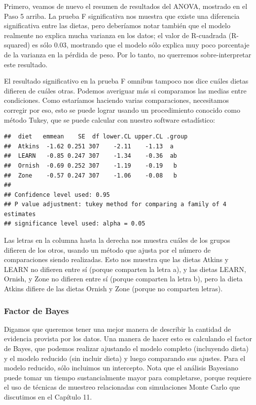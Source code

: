 \documentclass[
  12pt,
]{book}
\theoremstyle{definition}
\theoremstyle{definition}
\theoremstyle{definition}
\theoremstyle{remark}
\begin{document}
Primero, veamos de nuevo el resumen de resultados del ANOVA, mostrado en el Paso 5 arriba. La prueba F significativa nos muestra que existe una diferencia significativa entre las dietas, pero deberíamos notar también que el modelo realmente no explica mucha varianza en los datos; el valor de R-cuadrada (R-squared) es sólo 0.03, mostrando que el modelo sólo explica muy poco porcentaje de la varianza en la pérdida de peso. Por lo tanto, no querremos sobre-interpretar este resultado.

El resultado significativo en la prueba F omnibus tampoco nos dice cuáles dietas difieren de cuáles otras. Podemos averiguar más si comparamos las medias entre condiciones. Como estaríamos haciendo varias comparaciones, necesitamos corregir por eso, esto se puede lograr usando un procedimiento conocido como método Tukey, que se puede calcular con nuestro software estadístico:

\begin{verbatim}
##  diet   emmean    SE  df lower.CL upper.CL .group
##  Atkins  -1.62 0.251 307    -2.11    -1.13  a    
##  LEARN   -0.85 0.247 307    -1.34    -0.36  ab   
##  Ornish  -0.69 0.252 307    -1.19    -0.19   b   
##  Zone    -0.57 0.247 307    -1.06    -0.08   b   
## 
## Confidence level used: 0.95 
## P value adjustment: tukey method for comparing a family of 4 estimates 
## significance level used: alpha = 0.05
\end{verbatim}

Las letras en la columna hasta la derecha nos muestra cuáles de los grupos difieren de los otros, usando un método que ajusta por el número de comparaciones siendo realizadas. Esto nos muestra que las dietas Atkins y LEARN no difieren entre sí (porque comparten la letra a), y las dietas LEARN, Ornish, y Zone no difieren entre sí (porque comparten la letra b), pero la dieta Atkins difiere de las dietas Ornish y Zone (porque no comparten letras).

\hypertarget{factor-de-bayes}{%
\subsubsection{Factor de Bayes}\label{factor-de-bayes}}

Digamos que queremos tener una mejor manera de describir la cantidad de evidencia provista por los datos. Una manera de hacer esto es calculando el factor de Bayes, que podemos realizar ajustando el modelo completo (incluyendo dieta) y el modelo reducido (sin incluir dieta) y luego comparando sus ajustes. Para el modelo reducido, sólo incluimos un intercepto. Nota que el análisis Bayesiano puede tomar un tiempo sustancialmente mayor para completarse, porque requiere el uso de técnicas de muestreo relacionadas con simulaciones Monte Carlo que discutimos en el Capítulo 11.
\end{document}
